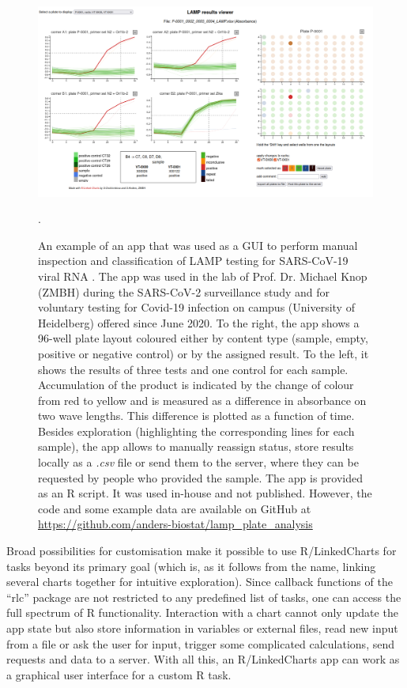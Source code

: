 \documentclass[twocolumn,10pt]{article}
\begin{document}
\begin{figure}[t]
   \includegraphics[width=\textwidth]{FigG/figG.png}
   \caption{An example of an app that was used as a GUI to perform manual inspection and classification of LAMP testing for SARS-CoV-19 viral RNA \citep{herbst_2021}. The app was used in the lab of Prof. Dr. Michael Knop (ZMBH) during the SARS-CoV-2 surveillance study \citep{deckert_2021} and for voluntary testing for Covid-19 infection on campus (University of Heidelberg) offered since June 2020. To the right, the app shows a 96-well plate layout coloured either by content type (sample, empty, positive or negative control) or by the assigned result. To the left, it shows the results of three tests and one control for each sample. Accumulation of the product is indicated by the change of colour from red to yellow and is measured as a difference in absorbance on two wave lengths. This difference is plotted as a function of time. Besides exploration (highlighting the corresponding lines for each sample), the app allows to manually reassign status, store results locally as a \emph{.csv} file or send them to the server, where they can be requested by people who provided the sample. The app is provided as an R script. It was used in-house and not published. However, the code and some example data are available on GitHub at \url{https://github.com/anders-biostat/lamp_plate_analysis}}.
   \label{lc_FigG}
\end{figure}

Broad possibilities for customisation make it possible to use R/LinkedCharts for tasks beyond its primary goal (which is, as it follows from the name, linking several charts together for intuitive exploration). Since callback functions of the ``rlc'' package are not restricted to any predefined list of tasks, one can access the full spectrum of R functionality. Interaction with a chart cannot only update the app state but also store information in variables or external files, read new input from a file or ask the user for input, trigger some complicated calculations, send requests and data to a server. With all this, an R/LinkedCharts app can work as a graphical user interface for a custom R task.
\end{document}
